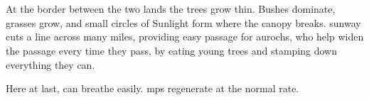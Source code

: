 
\section{}
\label{sunway}

\begin{figure}[t!]
\end{figure}

At the border between the two lands the trees grow thin.
Bushes dominate, grasses grow, and small circles of Sunlight form where the canopy breaks.
\Gls{sunway} cuts a line across many miles, providing easy passage for aurochs, who help widen the passage every time they pass, by eating young trees and stamping down everything they can.

Here at last,  can breathe easily.
\Glspl{mp} regenerate at the normal rate.

